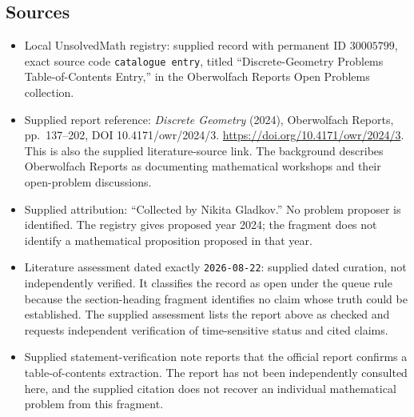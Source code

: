\documentclass[11pt]{article}
\begin{document}
\subsection{Sources}
\begin{itemize}
\item Local UnsolvedMath registry: supplied record with permanent ID \(30005799\), exact source code \texttt{catalogue entry}, titled ``Discrete-Geometry Problems Table-of-Contents Entry,'' in the Oberwolfach Reports Open Problems collection.
\item Supplied report reference: \emph{Discrete Geometry} (2024), Oberwolfach Reports, pp.~137--202, DOI 10.4171/owr/2024/3. \url{https://doi.org/10.4171/owr/2024/3}. This is also the supplied literature-source link. The background describes Oberwolfach Reports as documenting mathematical workshops and their open-problem discussions.
\item Supplied attribution: ``Collected by Nikita Gladkov.'' No problem proposer is identified. The registry gives proposed year 2024; the fragment does not identify a mathematical proposition proposed in that year.
\item Literature assessment dated exactly \texttt{2026-08-22}: supplied dated curation, not independently verified. It classifies the record as open under the queue rule because the section-heading fragment identifies no claim whose truth could be established. The supplied assessment lists the report above as checked and requests independent verification of time-sensitive status and cited claims.
\item Supplied statement-verification note reports that the official report confirms a table-of-contents extraction. The report has not been independently consulted here, and the supplied citation does not recover an individual mathematical problem from this fragment.
\end{itemize}
\end{document}
